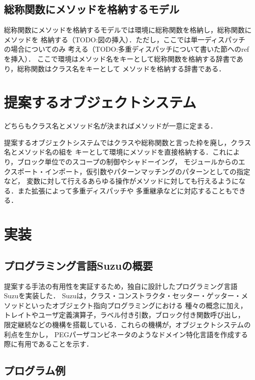 \documentclass{ipsjprosym}
\begin{document}
\subsection{総称関数にメソッドを格納するモデル}

総称関数にメソッドを格納するモデルでは環境に総称関数を格納し，総称関数にメソッドを
格納する（TODO:図の挿入）．ただし，ここでは単一ディスパッチの場合についてのみ
考える（TODO:多重ディスパッチについて書いた節へのrefを挿入）．
ここで環境はメソッド名をキーとして総称関数を格納する辞書であり，総称関数はクラス名をキーとして
メソッドを格納する辞書である．

\section{提案するオブジェクトシステム}


どちらもクラス名とメソッド名が決まればメソッドが一意に定まる．

提案するオブジェクトシステムではクラスや総称関数と言った枠を廃し，クラス名とメソッド名の組を
キーとして環境にメソッドを直接格納する．これにより，ブロック単位でのスコープの制御やシャドーイング，
モジュールからのエクスポート・インポート，仮引数やパターンマッチングのパターンとしての指定など，
変数に対して行えるあらゆる操作がメソッドに対しても行えるようになる．また拡張によって多重ディスパッチや
多重継承などに対応することもできる．

\section{実装}

\subsection{プログラミング言語Suzuの概要}

提案する手法の有用性を実証するため，独自に設計したプログラミング言語Suzuを実装した．
Suzuは，クラス・コンストラクタ・セッター・ゲッター・メソッドといったオブジェクト指向プログラミングにおける
種々の概念に加え，トレイトやユーザ定義演算子，ラベル付き引数，ブロック付き関数呼び出し，
限定継続などの機構を搭載している．これらの機構が，オブジェクトシステムの利点を生かし，
PEGパーザコンビネータのようなドメイン特化言語を作成する際に有用であることを示す．

\subsection{プログラム例}
\end{document}
